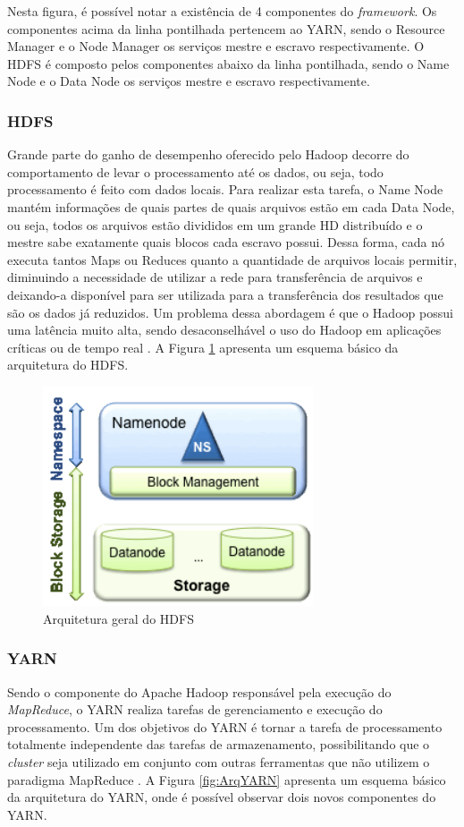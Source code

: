 Nesta figura, é possível notar a existência de 4 componentes do \textit{framework}. Os componentes acima da linha pontilhada pertencem ao YARN, sendo o Resource Manager e o Node Manager os serviços mestre e escravo respectivamente. O HDFS é composto pelos componentes abaixo da linha pontilhada, sendo o Name Node e o Data Node os serviços mestre e escravo respectivamente.

\subsubsection{HDFS}
Grande parte do ganho de desempenho oferecido pelo Hadoop decorre do comportamento de levar o processamento até os dados, ou seja, todo processamento é feito com dados locais. Para realizar esta tarefa, o Name Node mantém informações de quais partes de quais arquivos estão em cada Data Node, ou seja, todos os arquivos estão divididos em um grande HD distribuído e o mestre sabe exatamente quais blocos cada escravo possui. Dessa forma, cada nó executa tantos Maps ou Reduces quanto a quantidade de arquivos locais permitir, diminuindo a necessidade de utilizar a rede para transferência de arquivos e deixando-a disponível para ser utilizada para a transferência dos resultados que são os dados já reduzidos. Um problema dessa abordagem é que o Hadoop possui uma latência muito alta, sendo desaconselhável o uso do Hadoop em aplicações críticas ou de tempo real \cite{BookHadoop}. A Figura \ref{fig:ArqHDFS} apresenta um esquema básico da arquitetura do HDFS.

\begin{figure}[!hbt]
   \centering
   \includegraphics[width=8cm]{figuras/Figura07-HDFS.png}
   \caption{Arquitetura geral do HDFS \cite{HDFS}}
   \label{fig:ArqHDFS}
\end{figure}

\subsubsection{YARN}
Sendo o componente do Apache Hadoop responsável pela execução do \emph{MapReduce}, o YARN realiza tarefas de gerenciamento e execução do processamento. Um dos objetivos do YARN é tornar a tarefa de processamento totalmente independente das tarefas de armazenamento, possibilitando que o \textit{cluster} seja utilizado em conjunto com outras ferramentas que não utilizem o paradigma MapReduce \cite{Vavilapalli}. A Figura \ref{fig:ArqYARN} apresenta um esquema básico da arquitetura do YARN, onde é possível observar dois novos componentes do YARN.

